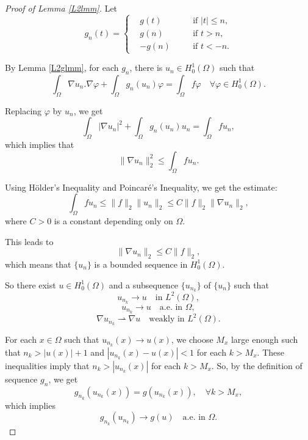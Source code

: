 \documentclass[a4paper, 11pt]{report}
\theoremstyle{definition}\newtheorem*{rmk}{Remark}
\begin{document}
\begin{proof}[Proof of Lemma \ref{L2lmm}]
\mbox{}

Let
\[
g_n(t)=\left\{
\begin{aligned}
& g(t) \quad &&\text{if } |t| \le n,\\
& g(n) \quad &&\text{if } t > n,\\
& -g(n) \quad &&\text{if } t < -n.
\end{aligned}
\right.
\]

By Lemma \ref{L2glmm}, for each $g_n$, there is $u_n \in H^1_0(\Omega)$ such that
\begin{equation}\label{sol3}
\int_{\Omega} \nabla u_n . \nabla \varphi + \int_{\Omega} g_n(u_n)\varphi = \int_{\Omega}f\varphi \quad \forall \varphi \in H^1_0(\Omega).
\end{equation}

Replacing $\varphi$ by $u_n$, we get
\begin{equation}\label{equa1}
\int_{\Omega} |\nabla u_{n}|^2 + \int_{\Omega} g_n(u_n)u_n = \int_{\Omega}fu_n,
\end{equation}
which implies that
\[
\| \nabla u_n\|^2_{2} \le \int_{\Omega}fu_n .
\]

Using H\"older's Inequality and Poincar\'e's Inequality, we get the estimate:
\begin{equation}\label{ineq1}
\int_{\Omega}fu_n \le \| f\|_{2}\| u_n\|_{2} \le C \| f\|_{2}\| \nabla u_n\|_2,
\end{equation}
where $C>0$ is a constant depending only on $\Omega$. 

This leads to
\begin{equation}\label{ineq2}
\| \nabla u_n\|_{2} \le C \| f\|_{2},
\end{equation}
which means that $\{u_n\}$ is a bounded sequence in $H^1_0(\Omega)$.

So there exist $u \in H^1_0(\Omega )$ and a subsequence $\{u_{n_k}\}$ of $\{u_n\}$ such that
\[
u_{n_k} \to u\quad \text{in } L^2(\Omega),
\]
\[
u_{n_k} \to u \quad \text{a.e.\ in } \Omega,
\]
\begin{equation}\label{conv6}
\nabla u_{n_k} \rightharpoonup \nabla u \quad \text{weakly in } L^2(\Omega) .
\end{equation}

For each $x\in \Omega$ such that $u_{n_k}(x) \to u(x)$, we choose $M_x$ large enough such that $n_k > |u(x)| + 1$ and $|u_{n_k}(x) - u(x)| < 1$ for each $k > M_x$. These inequalities imply that $n_k > |u_{n_k}(x)|$ for each $k > M_x$. So, by the definition of sequence $g_n$, we get 
\[
g_{n_k}(u_{n_k}(x)) = g(u_{n_k}(x)), \quad\forall k > M_x,
\]
which implies
\[
g_{n_k}(u_{n_k})\to g(u)\quad \text{a.e.\ in }\Omega .
\]


\end{proof}
\end{document}
